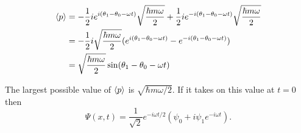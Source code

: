 \documentclass{article}
\begin{document}
\begin{align*}
  \braket{p}                   & = -\frac{1}{2} i e^{i (\theta_1 - \theta_0 - \omega t)} \sqrt{\frac{\hbar m \omega}{2}} + \frac{1}{2} i e^{-i (\theta_1 - \theta_0 - \omega t)} \sqrt{\frac{\hbar m \omega}{2}} \\
                               & = -\frac{1}{2} i \sqrt{\frac{\hbar m \omega}{2}} (e^{i (\theta_1 - \theta_0 - \omega t)} - e^{-i (\theta_1 - \theta_0 - \omega t)})                                             \\
                               & = \sqrt{\frac{\hbar m \omega}{2}} \sin (\theta_1 - \theta_0 - \omega t)
\end{align*}

The largest possible value of $\braket{p}$ is $\sqrt{\hbar m \omega / 2}$. If it takes on this value at $t = 0$ then \[\Psi(x, t) = \frac{1}{\sqrt{2}} e^{-i \omega t / 2} (\psi_0 + i \psi_1 e^{-i \omega t}).\]

\setcounter{subsection}{42}
\subsection{}
\end{document}
